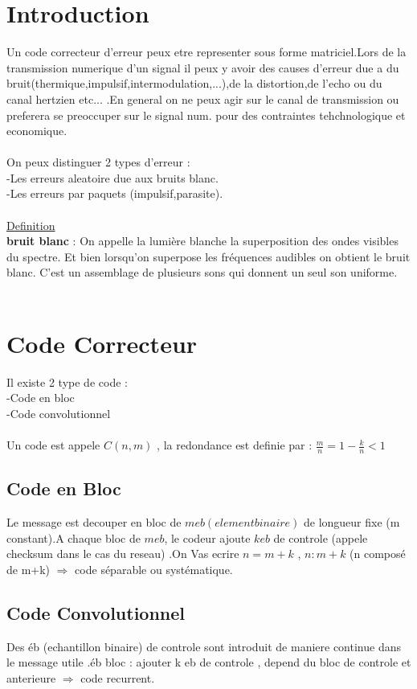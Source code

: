 \documentclass[a4paper,8pt,openany]{book}
\begin{document}
\section{Introduction}
Un code correcteur d'erreur peux etre representer sous forme matriciel.Lors de la transmission numerique d'un signal il peux y avoir des causes d'erreur due a du bruit(thermique,impulsif,intermodulation,...),de la distortion,de l'echo ou du canal hertzien etc... .En general on ne peux agir sur le canal de transmission ou preferera se preoccuper sur le signal num. pour des contraintes tehchnologique et economique.\\
\\
On peux distinguer 2 types d'erreur :\\
-Les erreurs aleatoire due aux bruits blanc.\\
-Les erreurs par paquets (impulsif,parasite).\\
\\
\underline{Definition}\\
\textbf{bruit blanc} : On appelle la lumière blanche la superposition des ondes visibles du spectre. Et bien lorsqu’on superpose les fréquences audibles on obtient le bruit blanc. C’est un assemblage de plusieurs sons qui donnent un seul son uniforme.\\
\\
\section{Code Correcteur}
Il existe 2 type de code : \\
-Code en bloc\\
-Code convolutionnel\\
\\
Un code est appele $C(n,m)$ , la redondance est definie par : $\frac{m}{n}=1-\frac{k}{n} < 1$

\subsection{Code en Bloc}
Le message est decouper en bloc de $m eb(element binaire)$ de longueur fixe (m constant).A chaque bloc de $m eb$, le codeur ajoute $k eb$ de controle (appele checksum dans le cas du reseau) .On Vas ecrire $n=m+k$ , 
$n:m+k$ (n compos\'e de m+k) $\Rightarrow$ code s\'eparable ou syst\'ematique.\\

\subsection{Code Convolutionnel}
Des \'eb (echantillon binaire) de controle sont introduit de maniere continue dans le message utile .\'eb bloc : ajouter k eb de controle , depend du bloc de controle et anterieure $\Rightarrow$ code recurrent.\\
\end{document}
